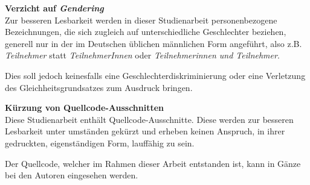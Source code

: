 \vfill
\textbf{Verzicht auf \textit{Gendering}} \\
Zur besseren Lesbarkeit werden in dieser Studienarbeit personenbezogene Bezeichnungen, die sich zugleich auf unterschiedliche Geschlechter beziehen, generell nur in der im Deutschen üblichen männlichen Form angeführt, also z.B. \textit{Teilnehmer} statt \textit{TeilnehmerInnen} oder \textit{Teilnehmerinnen und Teilnehmer}.

Dies soll jedoch keinesfalls eine Geschlechterdiskriminierung oder eine Verletzung des Gleichheitsgrundsatzes zum Ausdruck bringen.

\textbf{Kürzung von Quellcode-Ausschnitten} \\
Diese Studienarbeit enthält Quellcode-Ausschnitte. Diese werden zur besseren Lesbarkeit unter umständen gekürzt und erheben keinen Anspruch, in ihrer gedruckten, eigenständigen Form, lauffähig zu sein.

Der Quellcode, welcher im Rahmen dieser Arbeit entstanden ist, kann in Gänze bei den Autoren eingesehen werden.

\vfill